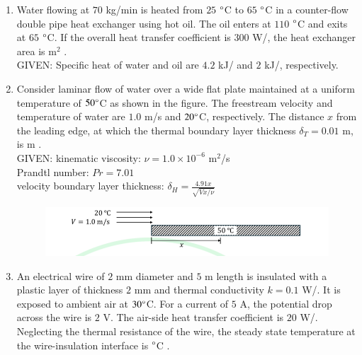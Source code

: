 \documentclass[journal,12pt,onecolumn]{IEEEtran}
\theoremstyle{remark}
\begin{document}
\begin{enumerate}
		\hfill{}
		
		\item Water flowing at $70$ kg/min is heated from $25$ $\degree$C to $65$ $\degree$C in a counter-flow double pipe heat exchanger using hot oil. The oil enters at $110$ $\degree$C and exits at $65$ $\degree$C. If the overall heat transfer coefficient is $300$ W/, the heat exchanger area is \underline{\hspace{2cm}} m$^2$ . \\
		GIVEN: Specific heat of water and oil are $4.2$ kJ/ and $2$ kJ/, respectively.
		
		\hfill{}
		
		\item Consider laminar flow of water over a wide flat plate maintained at a uniform temperature of $50 \degree$C as shown in the figure. The freestream velocity and temperature of water are $1.0$ m/s  and $20 \degree$C, respectively. The distance $x$ from the leading edge, at which the thermal boundary layer thickness $\delta_T = 0.01$ m, is \underline{\hspace{2cm}} m . \\
		GIVEN: kinematic viscosity: $\nu = 1.0 \times 10^{-6}$ m$^2$/s \\
		Prandtl number: $Pr = 7.01$ \\
		velocity boundary layer thickness: $\delta_H = \frac{4.91x}{\sqrt{Vx/\nu}}$
		\begin{figure}[h]
			\centering
			\includegraphics[width=0.8\columnwidth]{q52.png}
			\caption*{}
			\label{fig:q52}
		\end{figure}
		
		\hfill{}
		
		\item An electrical wire of $2$ mm diameter and $5$ m length is insulated with a plastic layer of thickness $2$ mm and thermal conductivity $k = 0.1$ W/. It is exposed to ambient air at $30 \degree$C. For a current of $5$ A, the potential drop across the wire is $2$ V. The air-side heat transfer coefficient is $20$ W/. Neglecting the thermal resistance of the wire, the steady state temperature at the wire-insulation interface is \underline{\hspace{2cm}}$\degree$C .
		

\end{enumerate}
\end{document}
